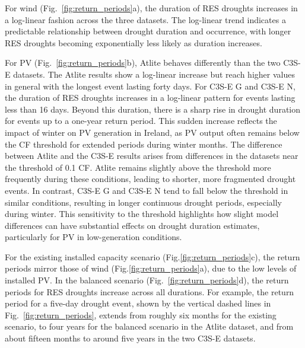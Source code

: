 \documentclass[a4paper, 11p1t]{article}
\begin{document}
For wind (Fig.~\ref{fig:return_periods}a), the duration of RES droughts increases in a log-linear fashion across the three datasets. The log-linear trend indicates a predictable relationship between drought duration and occurrence, with longer RES droughts becoming exponentially less likely as duration increases. 

For PV (Fig.~\ref{fig:return_periods}b), Atlite behaves differently than the two C3S-E datasets. The Atlite results show a log-linear increase but reach higher values in general with the longest event lasting forty days. For C3S-E G and C3S-E N, the duration of RES droughts increases in a log-linear pattern for events lasting less than 16 days. Beyond this duration, there is a sharp rise in drought duration for events up to a one-year return period. This sudden increase reflects the impact of winter on PV generation in Ireland, as PV output often remains below the CF threshold for extended periods during winter months. The difference between Atlite and the C3S-E results arises from differences in the datasets near the threshold of 0.1 CF. Atlite remains slightly above the threshold more frequently during these conditions, leading to shorter, more fragmented drought events. In contrast, C3S-E G and C3S-E N tend to fall below the threshold in similar conditions, resulting in longer continuous drought periods, especially during winter. This sensitivity to the threshold highlights how slight model differences can have substantial effects on drought duration estimates, particularly for PV in low-generation conditions.

For the existing installed capacity scenario (Fig.\ref{fig:return_periods}c), the return periods mirror those of wind (Fig.\ref{fig:return_periods}a), due to the low levels of installed PV. In the balanced scenario (Fig.~\ref{fig:return_periods}d), the return periods for RES droughts increase across all durations. For example, the return period for a five-day drought event, shown by the vertical dashed lines in Fig.~\ref{fig:return_periods}, extends from roughly six months for the existing scenario, to four years for the balanced scenario in the Atlite dataset, and from about fifteen months to around five years in the two C3S-E datasets. %
\end{document}
